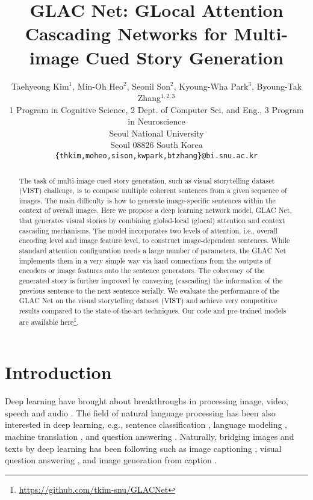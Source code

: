 \documentclass[11pt,a4paper]{article}
\title{GLAC Net: GLocal Attention Cascading Networks for Multi-image Cued Story Generation}
\author{Taehyeong Kim$^1$, Min-Oh Heo$^2$, Seonil Son$^2$, Kyoung-Wha Park$^3$, Byoung-Tak Zhang$^{1,2,3}$  \\
  1 Program in Cognitive Science, 2 Dept. of Computer Sci. and Eng., 3 Program in Neuroscience\\
  Seoul National University \\
  Seoul 08826  South Korea \\
  {\tt  \{thkim,moheo,sison,kwpark,btzhang\}@bi.snu.ac.kr} \\}
\date{}
\begin{document}
\maketitle
\begin{abstract}
The task of multi-image cued story generation, such as visual storytelling dataset (VIST) challenge, is to compose multiple coherent sentences from a given sequence of images. 
The main difficulty is how to generate image-specific sentences within the context of overall images. 
Here we propose a deep learning network model, GLAC Net, that generates visual stories by combining global-local (glocal) attention and context cascading mechanisms. 
The model incorporates two levels of attention, i.e., overall encoding level and image feature level, to construct image-dependent sentences.
While standard attention configuration needs a large number of parameters, the GLAC Net implements them in a very simple way via hard connections from the outputs of encoders or image features onto the sentence generators. 
The coherency of the generated story is further improved by conveying (cascading) the information of the previous sentence to the next sentence serially. 
We evaluate the performance of the GLAC Net on the visual storytelling dataset (VIST) and achieve very competitive results compared to the state-of-the-art techniques. Our code and pre-trained models are available here\footnote{\url{https://github.com/tkim-snu/GLACNet}}.



\end{abstract}

\section{Introduction} 



Deep learning have brought about breakthroughs in processing image, video, speech and audio \cite{lecun2015deep}.
The field of natural language processing has been also interested in deep learning, e.g., sentence classification \cite{kim2014convolutional,iyyer2015deep}, language modeling \cite{bengio2003neural,mikolov2013distributed}, machine translation \cite{sutskever2014sequence,Bah2014nmt,wu2016google}, and question answering \cite{hermann2015teaching}.
Naturally, bridging images and texts by deep learning has been following \cite{belz20018from} such as image captioning \cite{vinyals2015show,xu2015showattend,Karpathy2017dva}, visual question answering \cite{antol2015vqa,kim2016multimodal}, and image generation from caption \cite{reed2016generative,zhang2017stackgan}.
\end{document}
